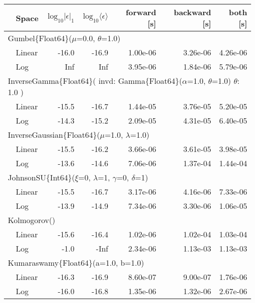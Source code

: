 \begin{tabular}{|llrrrrr|} \hline
& Space & $\mbox{log}_{10}|\epsilon|_1$ & $\mbox{log}_{10}\langle\epsilon\rangle$ & forward [s] & backward [s] & both [s]\\ \hline
\multicolumn{7}{|l|}{Gumbel\{Float64\}($\mu$=0.0, $\theta$=1.0)}\\ \hline
& Linear & {\color{blue}-16.0} & {\color{blue}-16.9} & {\color{blue}1.00e-06} & 3.26e-06 & {\color{blue}4.26e-06}\\
& Log & Inf & Inf & 3.95e-06 & {\color{blue}1.84e-06} & 5.79e-06\\
\hline
\multicolumn{7}{|l|}{InverseGamma\{Float64\}(
invd: Gamma\{Float64\}($\alpha$=1.0, $\theta$=1.0)
$\theta$: 1.0
)
}\\ \hline
& Linear & {\color{blue}-15.5} & {\color{blue}-16.7} & {\color{blue}1.44e-05} & {\color{blue}3.76e-05} & {\color{blue}5.20e-05}\\
& Log & -14.3 & -15.2 & 2.09e-05 & 4.31e-05 & 6.40e-05\\
\hline
\multicolumn{7}{|l|}{InverseGaussian\{Float64\}($\mu$=1.0, $\lambda$=1.0)}\\ \hline
& Linear & {\color{blue}-15.5} & {\color{blue}-16.2} & {\color{blue}3.66e-06} & {\color{blue}3.61e-05} & {\color{blue}3.98e-05}\\
& Log & -13.6 & -14.6 & 7.06e-06 & 1.37e-04 & 1.44e-04\\
\hline
\multicolumn{7}{|l|}{JohnsonSU\{Int64\}($\xi$=0, $\lambda$=1, $\gamma$=0, $\delta$=1)}\\ \hline
& Linear & {\color{blue}-15.5} & {\color{blue}-16.7} & {\color{blue}3.17e-06} & 4.16e-06 & {\color{blue}7.33e-06}\\
& Log & -13.9 & -14.9 & 7.34e-06 & {\color{blue}3.30e-06} & 1.06e-05\\
\hline
\multicolumn{7}{|l|}{Kolmogorov()}\\ \hline
& Linear & {\color{blue}-15.6} & -16.4 & {\color{blue}1.02e-06} & {\color{blue}1.02e-04} & {\color{blue}1.03e-04}\\
& Log & -1.0 & {\color{blue}-Inf} & 2.34e-06 & 1.13e-03 & 1.13e-03\\
\hline
\multicolumn{7}{|l|}{Kumaraswamy\{Float64\}(a=1.0, b=1.0)}\\ \hline
& Linear & {\color{blue}-16.3} & {\color{blue}-16.9} & {\color{blue}8.60e-07} & {\color{blue}9.00e-07} & {\color{blue}1.76e-06}\\
& Log & -16.0 & -16.8 & 1.35e-06 & 1.32e-06 & 2.67e-06\\

\end{tabular}
